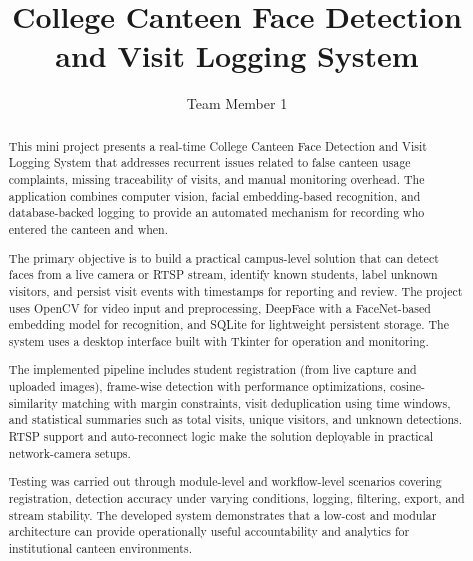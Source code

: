 \documentclass{fisatprojectfinal}
\title{College Canteen Face Detection and Visit Logging System}
\author{Team Member 1}
\begin{document}
\maketitle
\makecert

\newpage
{}
\setcounter{page}{1}
\thispagestyle{empty}
\renewcommand\abstractname{ABSTRACT}
\begin{abstract}
	\vspace{2cm}
	\begin{onehalfspace}
		This mini project presents a real-time College Canteen Face Detection and Visit Logging System that addresses recurrent issues related to false canteen usage complaints, missing traceability of visits, and manual monitoring overhead. The application combines computer vision, facial embedding-based recognition, and database-backed logging to provide an automated mechanism for recording who entered the canteen and when.

		The primary objective is to build a practical campus-level solution that can detect faces from a live camera or RTSP stream, identify known students, label unknown visitors, and persist visit events with timestamps for reporting and review. The project uses OpenCV for video input and preprocessing, DeepFace with a FaceNet-based embedding model for recognition, and SQLite for lightweight persistent storage. The system uses a desktop interface built with Tkinter for operation and monitoring.

		The implemented pipeline includes student registration (from live capture and uploaded images), frame-wise detection with performance optimizations, cosine-similarity matching with margin constraints, visit deduplication using time windows, and statistical summaries such as total visits, unique visitors, and unknown detections. RTSP support and auto-reconnect logic make the solution deployable in practical network-camera setups.

		Testing was carried out through module-level and workflow-level scenarios covering registration, detection accuracy under varying conditions, logging, filtering, export, and stream stability. The developed system demonstrates that a low-cost and modular architecture can provide operationally useful accountability and analytics for institutional canteen environments.
	\end{onehalfspace}
\end{abstract}
\end{document}
